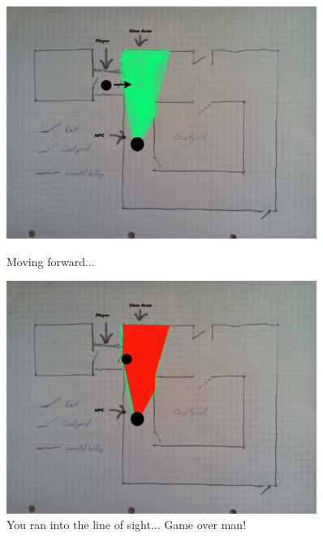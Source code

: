 \documentclass[12pt]{article}
\begin{document}
\begin{figure}
	\centering
	\begin{minipage}{0.45\textwidth}
		\centering
		\includegraphics[width=0.9\textwidth]{Images/movingintosightfield} %
		\caption{Moving forward...}
	\end{minipage}\hfill
	\begin{minipage}{0.45\textwidth}
		\centering
		\includegraphics[width=0.9\textwidth]{Images/gotcaught} %
		\caption{You ran into the line of sight... Game over man!}
	\end{minipage}
\end{figure}
\end{document}
